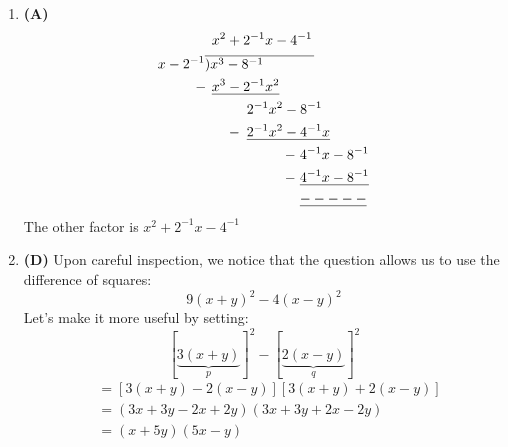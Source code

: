 \begin{multicols}{2}
\begin{enumerate}[label={\textbf{\arabic*.}}]
    \item \textbf{(A)} \begin{align*} 
        & \hspace{5pt} x^ 2 + 2^{-1}x -4^{-1} \\ \vspace{-20pt} 
        x - 2^{-1}& \overline{)x^3 - 8^{-1} \hspace{.5in}} \\
        -\hspace{-1pt} & \hspace{5pt} \underline{x^3 - 2^{-1}x^2} \\
        & \hspace{30pt} 2^{-1}x^2 - 8^{-1} \\
        -\hspace{-25pt} & \hspace{30pt} \underline{2^{-1}x^2 - 4^{-1}x} \\
       -\hspace{-65pt} & \hspace{68pt} 4^{-1}x - 8^{-1} \\
       -\hspace{-65pt} & \hspace{68pt} \underline{4^{-1}x - 8^{-1} } \\
       & \hspace{68pt} \underline{-----} 
    \end{align*}
    The other factor is $x^ 2 + 2^{-1}x -4^{-1}$

    \item \textbf{(D)} Upon careful inspection, we notice that the question allows us to use the difference of squares:
        \[9(x + y)^2 - 4(x - y)^2\]
        Let's make it more useful by setting:
        \[[\underbrace{3(x + y)}_{p}]^2 - [\underbrace{2(x - y)}_{q}]^2\]
        \begin{align*}
            & = \left[3(x + y) - 2(x - y)\right]\left[3(x + y) + 2(x - y)\right] \\
            & = \left(3x + 3y - 2x + 2y\right)\left(3x + 3y + 2x - 2y\right) \\
            & = (x + 5y)(5x - y)
        \end{align*}
    


\end{enumerate}
\end{multicols}
